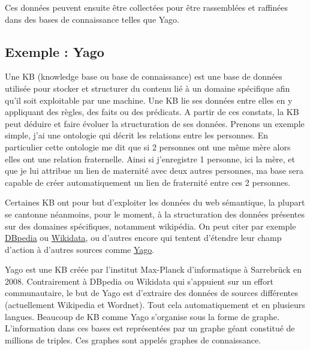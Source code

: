 Ces données peuvent ensuite être collectées pour être rassemblées et raffinées dans des bases de connaissance telles que Yago.

\subsection{Exemple : Yago}

Une KB (knowledge base ou base de connaissance) est une base de données utilisée pour stocker et structurer du contenu lié à un domaine spécifique afin qu'il soit exploitable par une machine. Une KB lie ses données entre elles en y appliquant des règles, des faits ou des prédicats. A partir de ces constats, la KB peut déduire et faire évoluer la structuration de ses données. Prenons un exemple simple, j'ai une ontologie qui décrit les relations entre les personnes. En particulier cette ontologie me dit que si 2 personnes ont une même mère alors elles ont une relation fraternelle. Ainsi si j'enregistre 1 personne, ici la mère, et que je lui attribue un lien de maternité avec deux autres personnes, ma base sera capable de créer automatiquement un lien de fraternité entre ces 2 personnes.

Certaines KB ont pour but d'exploiter les données du web sémantique, la plupart se cantonne néanmoins, pour le moment, à la structuration des données présentes sur des domaines spécifiques, notamment wikipédia. On peut citer par exemple \href{http://wiki.dbpedia.org/about}{DBpedia} ou \href{https://www.wikidata.org/wiki/Wikidata:Main_Page}{Wikidata}, ou d'autres encore qui tentent d'étendre leur champ d'action à d'autres sources comme \href{http://www.mpi-inf.mpg.de/departments/databases-and-information-systems/research/yago-naga/yago/}{Yago}.

Yago est une KB créée par l'institut Max-Planck d'informatique à Sarrebrück en 2008. Contrairement à DBpedia ou Wikidata qui s'appuient sur un effort communautaire, le but de Yago est d'extraire des données de sources différentes (actuellement Wikipedia et Wordnet). Tout cela automatiquement et en plusieurs langues. Beaucoup de KB comme Yago s'organise sous la forme de graphe. L'information dans ces bases est représentées par un graphe géant constitué de millions de triples. Ces graphes sont appelés graphes de connaissance.

